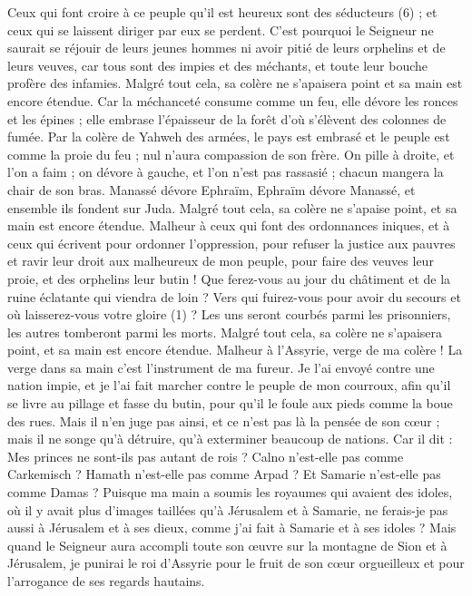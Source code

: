 \begin{multicols}{2}
Ceux qui font croire à ce peuple qu'il est heureux sont des séducteurs (6) ; et ceux qui se laissent diriger par eux se perdent.
C'est pourquoi le Seigneur ne saurait se réjouir de leurs jeunes hommes ni avoir pitié de leurs orphelins et de leurs veuves, car tous sont des impies et des méchants, et toute leur bouche profère des infamies. Malgré tout cela, sa colère ne s’apaisera point et sa main est encore étendue.
Car la méchanceté consume comme un feu, elle dévore les ronces et les épines ; elle embrase l’épaisseur de la forêt d’où s’élèvent des colonnes de fumée.
Par la colère de Yahweh des armées, le pays est embrasé et le peuple est comme la proie du feu ; nul n’aura compassion de son frère.
On pille à droite, et l’on a faim ; on dévore à gauche, et l’on n’est pas rassasié ; chacun mangera la chair de son bras.
Manassé dévore Ephraïm, Ephraïm dévore Manassé, et ensemble ils fondent sur Juda. Malgré tout cela, sa colère ne s’apaise point, et sa main est encore étendue.
\VerseOne{}Malheur à ceux qui font des ordonnances iniques, et à ceux qui écrivent pour ordonner l'oppression,
pour refuser la justice aux pauvres et ravir leur droit aux malheureux de mon peuple, pour faire des veuves leur proie, et des orphelins leur butin !
Que ferez-vous au jour du châtiment et de la ruine éclatante qui viendra de loin ? Vers qui fuirez-vous pour avoir du secours et où laisserez-vous votre gloire (1) ?
Les uns seront courbés parmi les prisonniers, les autres tomberont parmi les morts. Malgré tout cela, sa colère ne s’apaisera point, et sa main est encore étendue.
Malheur à l’Assyrie, verge de ma colère ! La verge dans sa main c’est l’instrument de ma fureur.
Je l’ai envoyé contre une nation impie, et je l’ai fait marcher contre le peuple de mon courroux, afin qu'il se livre au pillage et fasse du butin, pour qu’il le foule aux pieds comme la boue des rues.
Mais il n’en juge pas ainsi, et ce n’est pas là la pensée de son cœur ; mais il ne songe qu’à détruire, qu’à exterminer beaucoup de nations.
Car il dit : Mes princes ne sont-ils pas autant de rois ?
Calno n'est-elle pas comme Carkemisch ? Hamath n'est-elle pas comme Arpad ? Et Samarie n'est-elle pas comme Damas ?
Puisque ma main a soumis les royaumes qui avaient des idoles, où il y avait plus d’images taillées qu’à Jérusalem et à Samarie,
ne ferais-je pas aussi à Jérusalem et à ses dieux, comme j'ai fait à Samarie et à ses idoles ?
Mais quand le Seigneur aura accompli toute son œuvre sur la montagne de Sion et à Jérusalem, je punirai le roi d'Assyrie pour le fruit de son cœur orgueilleux et pour l’arrogance de ses regards hautains.

\end{multicols}
